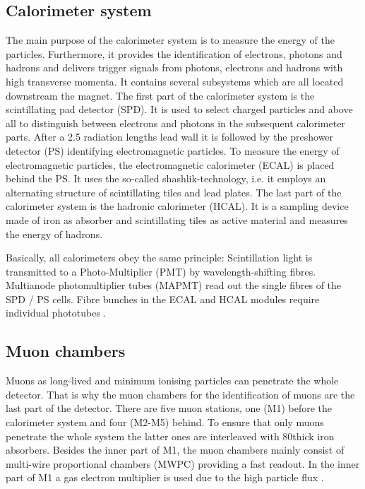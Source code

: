 \subsection{Calorimeter system}
The main purpose of the calorimeter system is to measure the energy of the particles.
Furthermore, it provides the identification of electrons, photons and hadrons and delivers trigger signals from photons, electrons and hadrons with high transverse momenta.
It contains several subsystems which are all located downstream the magnet.
The first part of the calorimeter system is the scintillating pad detector (SPD).
It is used to select charged particles and above all to distinguish between electrons and photons in the subsequent calorimeter parts.
After a 2.5 radiation lengths lead wall it is followed by the preshower detector (PS) identifying electromagnetic particles.
To measure the energy of electromagnetic particles, the electromagnetic calorimeter (ECAL) is placed behind the PS.
It uses the so-called shashlik-technology, i.e. it employs an alternating structure of scintillating tiles and lead plates.
The last part of the calorimeter system is the hadronic calorimeter (HCAL).
It is a sampling device made of iron as absorber and scintillating tiles as active material and measures the energy of hadrons.

Basically, all calorimeters obey the same principle:
Scintillation light is transmitted to a Photo-Multiplier (PMT) by wavelength-shifting fibres.
Multianode photomultiplier tubes (MAPMT) read out the single fibres of the SPD / PS cells.
Fibre bunches in the ECAL and HCAL modules require individual phototubes \cite{detector, PS_SPD, Calorimeter_Running, ECAL, HCAL}.

\subsection{Muon chambers}
Muons as long-lived and minimum ionising particles can penetrate the whole detector.
That is why the muon chambers for the identification of muons are the last part of the detector.
There are five muon stations, one (M1) before the calorimeter system and four (M2-M5) behind.
To ensure that only muons penetrate the whole system the latter ones are interleaved with 80\cm thick iron absorbers.
Besides the inner part of M1, the muon chambers mainly consist of multi-wire proportional chambers (MWPC) providing a fast readout.
In the inner part of M1 a gas electron multiplier is used due to the high particle flux \cite{detector, Muon_Performance}.

